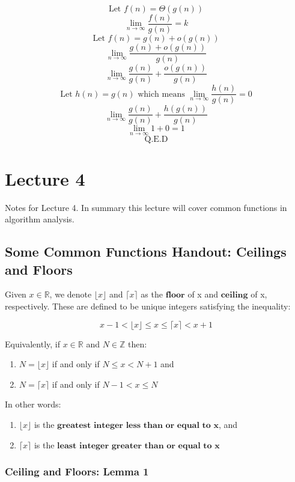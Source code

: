 \documentclass{article}
\begin{document}
$$\text{Let } f(n) = \Theta(g(n))$$
$$\lim_{n \rightarrow \infty} \frac{f(n)}{g(n)} = k$$
$$\text{Let } f(n) = g(n) + o(g(n))$$
$$\lim_{n \rightarrow \infty} \frac{g(n) + o(g(n))}{g(n)}$$
$$\lim_{n \rightarrow \infty} \frac{g(n)}{g(n)} + \frac{o(g(n))}{g(n)}$$
$$\text{Let } h(n) = g(n) \text{ which means } \lim_{n \rightarrow \infty} \frac{h(n)}{g(n)} = 0$$
$$\lim_{n \rightarrow \infty} \frac{g(n)}{g(n)} + \frac{h(g(n))}{g(n)}$$
$$\lim_{n \rightarrow \infty} 1 + 0 = 1$$
$$\text{Q.E.D}$$


\section{Lecture 4}

Notes for Lecture 4. In summary this lecture will cover common functions in algorithm analysis.

\subsection{Some Common Functions Handout: Ceilings and Floors}
Given $x \in \mathbb{R}$, we denote $\lfloor x \rfloor$ and $\lceil x \rceil$ as the $\textbf{floor}$ of x and $\textbf{ceiling}$ of x, respectively. These are defined to be unique integers satisfying the inequality:

$$x - 1 < \lfloor x \rfloor \le x \le \lceil x \rceil < x + 1$$

Equivalently, if $x \in \mathbb{R}$ and $N \in \mathbb{Z}$ then:

\begin{enumerate}
    \item $N = \lfloor x \rfloor$ if and only if $N \le x < N + 1$ and
    \item $N = \lceil x \rceil$ if and only if $N - 1 < x \le N$
\end{enumerate}

In other words:

\begin{enumerate}
    \item $\lfloor x \rfloor$ is the $\textbf{greatest integer less than or equal to x}$, and
    \item $\lceil x \rceil$ is the $\textbf{least integer greater than or equal to x}$
\end{enumerate}

\subsubsection{Ceiling and Floors: Lemma 1}
\end{document}
